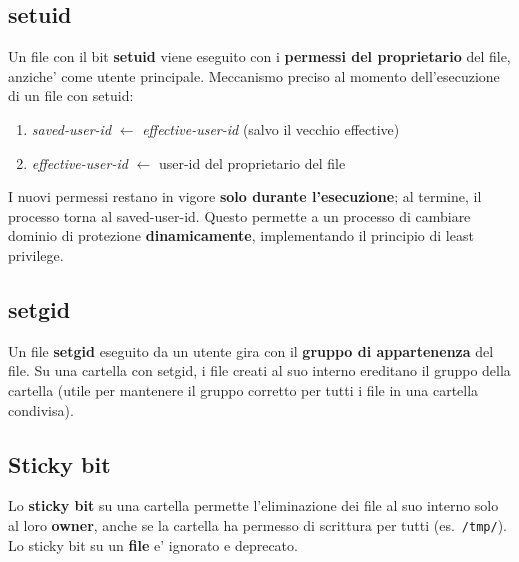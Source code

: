 \subsection{setuid}
Un file con il bit \textbf{setuid} viene eseguito con i \textbf{permessi del proprietario} del file, anziche' come utente principale. Meccanismo preciso al momento dell'esecuzione di un file con setuid:
\begin{enumerate}
  \item \textit{saved-user-id} $ \leftarrow $ \textit{effective-user-id} (salvo il vecchio effective)
  \item \textit{effective-user-id} $ \leftarrow $ user-id del proprietario del file
\end{enumerate}
I nuovi permessi restano in vigore \textbf{solo durante l'esecuzione}; al termine, il processo torna al saved-user-id. Questo permette a un processo di cambiare dominio di protezione \textbf{dinamicamente}, implementando il principio di least privilege.


\subsection{setgid}
Un file \textbf{setgid} eseguito da un utente gira con il \textbf{gruppo di appartenenza} del file. Su una cartella con setgid, i file creati al suo interno ereditano il gruppo della cartella (utile per mantenere il gruppo corretto per tutti i file in una cartella condivisa).

\subsection{Sticky bit}
Lo \textbf{sticky bit} su una cartella permette l'eliminazione dei file al suo interno solo al loro \textbf{owner}, anche se la cartella ha permesso di scrittura per tutti (es.\ \texttt{/tmp/}). Lo sticky bit su un \textbf{file} e' ignorato e deprecato.

